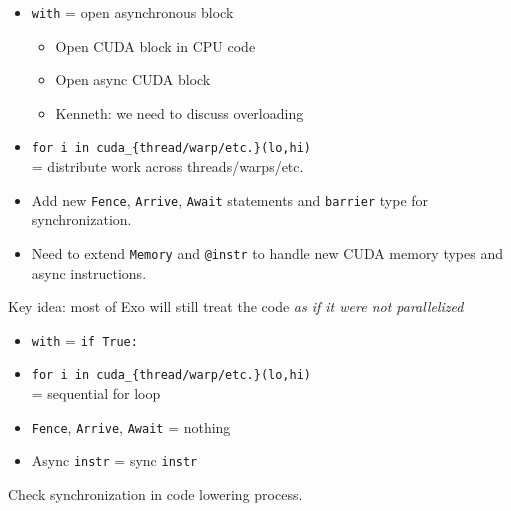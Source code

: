 \begin{minipage}[t]{0.5\textwidth}\fixminipage
{}
\begin{itemize}
  \item \texttt{with} = open asynchronous block
  \begin{itemize}
    \item Open CUDA block in CPU code
    \item Open async CUDA block
    \item Kenneth: we need to discuss overloading
  \end{itemize}
  \item \texttt{for i in cuda\_\{thread/warp/etc.\}(lo,hi)}\\ = distribute work across threads/warps/etc.
  \item Add new \texttt{Fence}, \texttt{Arrive}, \texttt{Await} statements and \texttt{barrier} type for synchronization.
  \item Need to extend \texttt{Memory} and \texttt{@instr} to handle new CUDA memory types and async instructions.
\end{itemize}


Key idea: most of Exo will still treat the code \textit{as if it were not parallelized}

\begin{itemize}
  \item \texttt{with} = \texttt{if True:}
  \item \texttt{for i in cuda\_\{thread/warp/etc.\}(lo,hi)}\\ = sequential for loop
  \item \texttt{Fence}, \texttt{Arrive}, \texttt{Await} = nothing
  \item Async \texttt{instr} = sync \texttt{instr}
\end{itemize}

Check synchronization in code lowering process.

\end{minipage} %
\newpage


